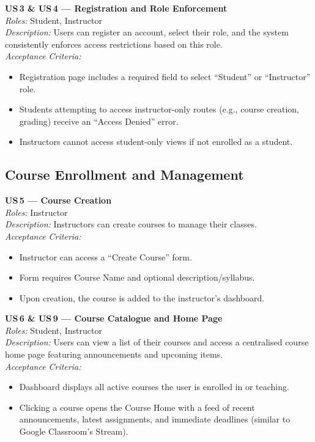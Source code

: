 \documentclass[11pt, legalpaper]{article}
\begin{document}
\begin{userstory}
  \textbf{US\,3 \& US\,4 — Registration and Role Enforcement}\\[4pt]
  \textit{Roles:} Student, Instructor\\[2pt]
  \textit{Description:} Users can register an account, select their role,
  and the system consistently enforces access restrictions based on this
  role.\\[4pt]
  \textit{Acceptance Criteria:}
  \begin{itemize}
    \item Registration page includes a required field to select ``Student'' or
          ``Instructor'' role.
    \item Students attempting to access instructor-only routes (e.g., course
          creation, grading) receive an ``Access Denied'' error.
    \item Instructors cannot access student-only views if not enrolled as a
          student.
  \end{itemize}
\end{userstory}

\subsection{Course Enrollment and Management}

\begin{userstory}
  \textbf{US\,5 — Course Creation}\\[4pt]
  \textit{Roles:} Instructor\\[2pt]
  \textit{Description:} Instructors can create courses to manage their
  classes.\\[4pt]
  \textit{Acceptance Criteria:}
  \begin{itemize}
    \item Instructor can access a ``Create Course'' form.
    \item Form requires Course Name and optional description/syllabus.
    \item Upon creation, the course is added to the instructor's dashboard.
  \end{itemize}
\end{userstory}

\begin{userstory}
  \textbf{US\,6 \& US\,9 — Course Catalogue and Home Page}\\[4pt]
  \textit{Roles:} Student, Instructor\\[2pt]
  \textit{Description:} Users can view a list of their courses and access a
  centralised course home page featuring announcements and upcoming
  items.\\[4pt]
  \textit{Acceptance Criteria:}
  \begin{itemize}
    \item Dashboard displays all active courses the user is enrolled in or
          teaching.
    \item Clicking a course opens the Course Home with a feed of recent
          announcements, latest assignments, and immediate deadlines (similar
          to Google Classroom's Stream).
  \end{itemize}
\end{userstory}
\end{document}
